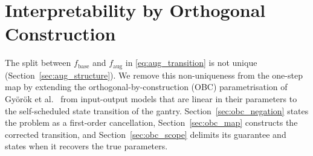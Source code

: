 \section{Interpretability by Orthogonal Construction}\label{sec:obc}

The split between $f_{\mathrm{base}}$ and $f_{\mathrm{aug}}$ in
\eqref{eq:aug_transition} is not unique (Section~\ref{sec:aug_structure}).
We remove this non-uniqueness from the one-step map by extending the
orthogonal-by-construction (OBC) parametrisation of Gy\"or\"ok et
al.~\cite{gyorok2026obc} from input-output models that are linear in their
parameters to the self-scheduled state transition of the gantry.
Section~\ref{sec:obc_negation} states the problem as a first-order
cancellation, Section~\ref{sec:obc_map} constructs the corrected transition,
and Section~\ref{sec:obc_scope} delimits its guarantee and states when it
recovers the true parameters.

